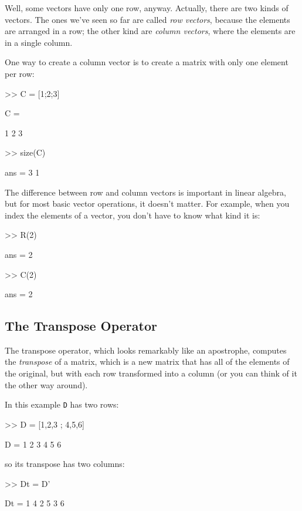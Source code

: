 Well, some vectors have only one row, anyway.  Actually, there are two kinds
of vectors.  The ones we've seen so far are called \emph{row vectors},
because the elements are arranged in a row; the other kind are
\emph{column vectors}, where the elements are in a single column.

One way to create a column vector is to create a matrix with only
one element per row:

\begin{code}
>> C = [1;2;3]

C =

     1
     2
     3

>> size(C)

ans = 3     1
\end{code}

The difference between row and column vectors is important in
linear algebra, but for most basic vector operations, it doesn't matter.
For example, when you index the elements of a vector, you don't have to know what kind
it is:


\begin{code}
>> R(2)

ans = 2

>> C(2)

ans = 2
\end{code}


\subsection{The Transpose Operator}

The transpose operator, which looks remarkably like an apostrophe,
computes the \emph{transpose} of a matrix, which is a new matrix
that has all of the elements of the original, but with each row
transformed into a column (or you can think of it the other way around).


In this example \lstinline{D} has two rows:

\begin{code}
>> D = [1,2,3 ; 4,5,6]

D =  1     2     3
     4     5     6
\end{code}
so its transpose has two columns:

\begin{code}
>> Dt = D'

Dt = 1     4
     2     5
     3     6
\end{code}

